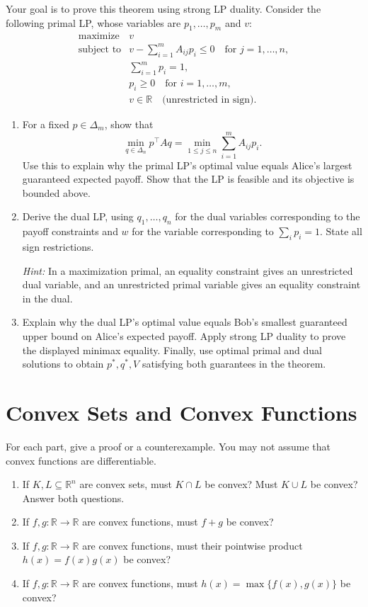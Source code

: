 \documentclass[10pt,letterpaper]{article}
\begin{document}
Your goal is to prove this theorem using strong LP duality. Consider the
following primal LP, whose variables are $p_1,\ldots,p_m$ and $v$:
\[
\begin{array}{ll}
\text{maximize} & v\\[2pt]
\text{subject to}
 & \displaystyle v-\sum_{i=1}^m A_{ij}p_i\leq 0
       \quad\text{for }j=1,\ldots,n,\\[6pt]
 & \displaystyle\sum_{i=1}^m p_i=1,\\[4pt]
 & p_i\geq 0\quad\text{for }i=1,\ldots,m,\\[2pt]
 & v\in\mathbb{R}\quad\text{(unrestricted in sign).}
\end{array}
\]
\begin{enumerate}
\item For a fixed $p\in\Delta_m$, show that
\[
\min_{q\in\Delta_n}p^\top A q
=\min_{1\leq j\leq n}\sum_{i=1}^m A_{ij}p_i.
\]
Use this to explain why the primal LP's optimal value equals Alice's
largest guaranteed expected payoff. Show that the LP is feasible and
its objective is bounded above.

\item Derive the dual LP, using $q_1,\ldots,q_n$ for the dual variables
corresponding to the payoff constraints and $w$ for the variable
corresponding to $\sum_i p_i=1$. State all sign restrictions.

\emph{Hint:} In a maximization primal, an equality constraint gives an
unrestricted dual variable, and an unrestricted primal variable gives
an equality constraint in the dual.

\item Explain why the dual LP's optimal value equals Bob's smallest
guaranteed upper bound on Alice's expected payoff. Apply strong LP duality
to prove the displayed minimax equality. Finally, use optimal primal and
dual solutions to obtain $p^*,q^*,V$ satisfying both guarantees in the
theorem.
\end{enumerate}

 \section{Convex Sets and Convex Functions}
For each part, give a proof or a counterexample. You may not assume that
convex functions are differentiable.
\begin{enumerate}
\item If $K,L\subseteq\mathbb{R}^n$ are convex sets, must $K\cap L$ be convex?
Must $K\cup L$ be convex? Answer both questions.
\item If $f,g:\mathbb{R}\to\mathbb{R}$ are convex functions, must $f+g$ be convex?
\item If $f,g:\mathbb{R}\to\mathbb{R}$ are convex functions, must their
pointwise product $h(x)=f(x)g(x)$ be convex?
\item If $f,g:\mathbb{R}\to\mathbb{R}$ are convex functions, must
$h(x)=\max\{f(x),g(x)\}$ be convex?
\end{enumerate}
\end{document}
